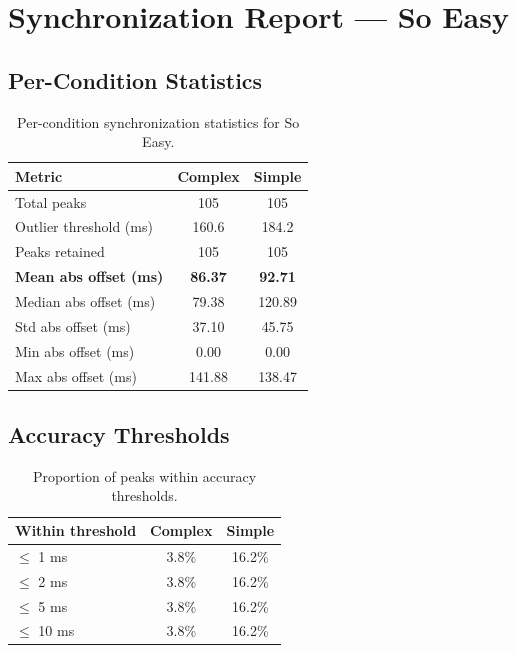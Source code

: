 
\section*{Synchronization Report --- So Easy}

\subsection*{Per-Condition Statistics}

\begin{table}[h!]
\centering
\begin{tabular}{|l|c|c|}
\hline
Metric & Complex & Simple \\
\hline
Total peaks & 105 & 105 \\
Outlier threshold (ms) & 160.6 & 184.2 \\
Peaks retained & 105 & 105 \\
\textbf{Mean abs offset (ms)} & \textbf{86.37} & \textbf{92.71} \\
Median abs offset (ms) & 79.38 & 120.89 \\
Std abs offset (ms) & 37.10 & 45.75 \\
Min abs offset (ms) & 0.00 & 0.00 \\
Max abs offset (ms) & 141.88 & 138.47 \\
\hline
\end{tabular}
\caption{Per-condition synchronization statistics for So Easy.}
\label{tab:sync_stats}
\end{table}

\subsection*{Accuracy Thresholds}

\begin{table}[h!]
\centering
\begin{tabular}{|l|c|c|}
\hline
Within threshold & Complex & Simple \\
\hline
$\leq$ 1 ms & 3.8\% & 16.2\% \\
$\leq$ 2 ms & 3.8\% & 16.2\% \\
$\leq$ 5 ms & 3.8\% & 16.2\% \\
$\leq$ 10 ms & 3.8\% & 16.2\% \\
\hline
\end{tabular}
\caption{Proportion of peaks within accuracy thresholds.}
\label{tab:sync_accuracy}
\end{table}

